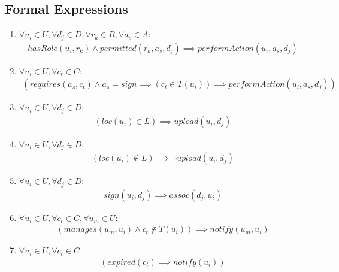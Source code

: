\documentclass[12pt]{article}
\begin{document}
\subsection{Formal Expressions}
\begin{enumerate}
  \item \(\forall u_i \in U, \forall d_j \in D, \forall r_k \in R, \forall a_s
    \in A: \)
    \begin{align*}
      hasRole(u_i, r_k) \land permitted(r_k, a_s, d_j) \implies
      performAction(u_i, a_s, d_j)
    \end{align*}
  \item \(\forall u_i \in U, \forall c_t \in C:\)
    \begin{align*}
      (requires(a_s, c_t) \land a_s = sign \implies (c_t \in T(u_i)) \implies
      performAction(u_i, a_s, d_j))
    \end{align*}
  \item \(\forall u_i \in U, \forall d_j \in D:\)
    \begin{align*}
      (loc(u_i) \in L) \implies upload(u_i, d_j)
    \end{align*}
  \item \(\forall u_i \in U, \forall d_j \in D:\)
    \begin{align*}
      (loc(u_i) \notin L) \implies \lnot upload(u_i, d_j)
    \end{align*}
  \item \(\forall u_i \in U, \forall d_j \in D:\)
    \begin{align*}
      sign(u_i, d_j) \implies assoc(d_j, u_i)
    \end{align*}
  \item \(\forall u_i \in U, \forall c_t \in C, \forall u_m \in U:\)
    \begin{align*}
      (manages(u_m, u_i) \land c_t \notin T(u_i)) \implies notify(u_m, u_i)
    \end{align*}
  \item \(\forall u_i \in U, \forall c_t \in C\)
    \begin{align*}
      (expired(c_t) \implies notify(u_i))
    \end{align*}
\end{enumerate}
\end{document}
